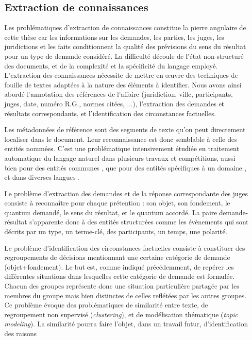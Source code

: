 \subsection{Extraction de connaissances}
\label{subsec:intro:ie}
Les problématiques d'extraction de connaissances constitue la pierre angulaire de cette thèse car les informations sur les demandes, les parties, les juges, les juridictions et les faits conditionnent la qualité des prévisions du sens du résultat pour un type de demande considéré.  La difficulté découle de l'état non-structuré des documents, et de la complexité et la spécificité du langage employé. L'extraction des connaissances nécessite de mettre en \oe uvre des techniques de fouille de textes adaptées à la nature des éléments à identifier. Nous avons ainsi abordé l'annotation des références de l'affaire (juridiction, ville, participants, juges, date, numéro R.G., normes citées, ...), l'extraction des demandes et résultats correspondants, et l'identification des circonstances factuelles.

Les métadonnées de référence sont des segments de texte qu'on peut directement localiser dans le document. Leur reconnaissance est donc semblable à celle des entités nommées. C'est une problématique intensivement étudiée en traitement automatique du langage naturel \citep{yadav2018surveyNeuralNER} dans plusieurs travaux et compétitions, aussi bien pour des entités communes \citep{tjong2003introCoNLL,grishman1996muc6}, que pour des entités spécifiques à un domaine \citep{kim2004bioNer, persson2012nbbioner,hanisch2005prominer}, et dans diverses langues \citep{li2018wcpbioner,alfred2014malayner,amarappa2015kannada}. 

Le problème d'extraction des demandes et de la réponse correspondante des juges consiste à reconnaître pour chaque prétention : son objet, son fondement, le quantum demandé, le sens du résultat, et le quantum accordé. La paire demande-résultat s'apparente donc à des entités structurées comme les évènements \cite{ace2005event} qui sont décrits par un type, un terme-clé, des participants, un temps, une polarité.

Le problème d'identification des circonstances factuelles consiste à constituer des regroupements de décisions mentionnant une certaine catégorie de demande (objet+fondement). Le but est, comme indiqué précédemment, de repérer les différentes situations dans lesquelles cette catégorie de demande est formulée. Chacun des groupes représente donc une situation particulière partagée par les membres du groupe mais bien distinctes de celles reflétées par les autres groupes. Ce problème évoque des problématiques de similarité entre texte, de regroupement non supervisé (\textit{clustering}), et de \og modélisation thématique \fg{} (\textit{topic modeling}).  La similarité pourra faire l'objet, dans un travail futur, d'identification des raisons

